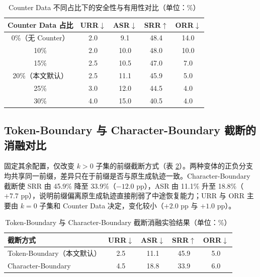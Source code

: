 \documentclass[fontset=fandol,type=master,campus=shenzhen,etitleauto=true]{hithesisbook}
\begin{document}
\begin{table}[htbp]
\centering
\caption{Counter Data 不同占比下的安全性与有用性对比（单位：\%）}
\label{tab:counter-ratio}
\small
\renewcommand{\arraystretch}{1.1}
\begin{tabular}{c c c c c}
\toprule
\textbf{Counter Data 占比} & \textbf{URR$\downarrow$} & \textbf{ASR$\downarrow$} & \textbf{SRR$\uparrow$} & \textbf{ORR$\downarrow$} \\
\midrule
0\%（无 Counter） & 2.0 & 9.1 & 48.4 & 14.0 \\
10\% & 2.0 & 10.0 & 48.0 & 10.0 \\
15\% & 2.5 & 10.5 & 47.0 & 7.0 \\
20\%（本文默认） & 2.5 & 11.1 & 45.9 & 5.0 \\
25\% & 3.0 & 12.0 & 44.5 & 4.0 \\
30\% & 4.0 & 15.0 & 40.5 & 4.0 \\
\bottomrule
\end{tabular}
\end{table}

\subsection{Token-Boundary 与 Character-Boundary 截断的消融对比}\label{token-char-ablation}

固定其余配置，仅改变 $k > 0$ 子集的前缀截断方式（表 \ref{tab:token-char-ablation}）。两种变体的正负分支均共享同一前缀，差异只在于前缀是否与原生成轨迹一致。Character-Boundary 截断使 SRR 由 45.9\% 降至 33.9\%（$-12.0$ pp），ASR 由 11.1\% 升至 18.8\%（$+7.7$ pp），说明前缀偏离原生成轨迹直接削弱了中途恢复能力；URR 与 ORR 主要由 $k = 0$ 子集和 Counter Data 决定，变化较小（$+2.0$ pp 与 $+1.0$ pp）。

\begin{table}[htbp]
\centering
\caption{Token-Boundary 与 Character-Boundary 截断消融实验结果（单位：\%）}
\label{tab:token-char-ablation}
\small
\renewcommand{\arraystretch}{1.1}
\begin{tabular}{l c c c c}
\toprule
\textbf{截断方式} & \textbf{URR$\downarrow$} & \textbf{ASR$\downarrow$} & \textbf{SRR$\uparrow$} & \textbf{ORR$\downarrow$} \\
\midrule
Token-Boundary（本文默认） & 2.5 & 11.1 & 45.9 & 5.0 \\
Character-Boundary & 4.5 & 18.8 & 33.9 & 6.0 \\
\bottomrule
\end{tabular}
\end{table}
\end{document}
